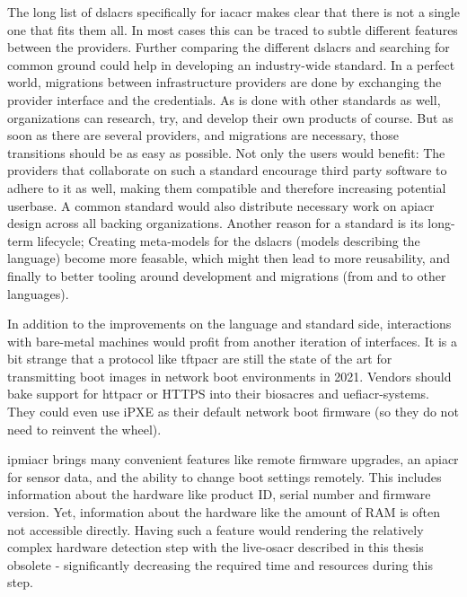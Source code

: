The long list of \gls{dslacr}s specifically for \gls{iacacr} makes clear that there is not a single one that fits them all. In most cases this can be traced to subtle different features between the providers. Further comparing the different \gls{dslacr}s and searching for common ground could help in developing an industry-wide standard. In a perfect world, migrations between infrastructure providers are done by exchanging the provider interface and the credentials. As is done with other standards as well, organizations can research, try, and develop their own products of course. But as soon as there are several providers, and migrations are necessary, those transitions should be as easy as possible. Not only the users would benefit: The providers that collaborate on such a standard encourage third party software to adhere to it as well, making them compatible and therefore increasing potential userbase. A common standard would also distribute necessary work on \gls{apiacr} design across all backing organizations. Another reason for a standard is its long-term lifecycle; Creating meta-models for the \gls{dslacr}s (models describing the language) become more feasable, which might then lead to more reusability, and finally to better tooling around development and migrations (from and to other languages).


In addition to the improvements on the language and standard side, interactions with bare-metal machines would profit from another iteration of interfaces. It is a bit strange that a protocol like \gls{tftpacr} are still the state of the art for transmitting boot images in network boot environments in 2021. Vendors should bake support for \gls{httpacr} or HTTPS into their \gls{biosacr}es and \gls{uefiacr}-systems. They could even use iPXE as their default network boot firmware (so they do not need to reinvent the wheel).

\Gls{ipmiacr} brings many convenient features like remote firmware upgrades, an \gls{apiacr} for sensor data, and the ability to change boot settings remotely. This includes information about the hardware like product ID, serial number and firmware version. Yet, information about the hardware like the amount of RAM is often not accessible directly. Having such a feature would rendering the relatively complex hardware detection step with the live-\gls{osacr} described in this thesis obsolete - significantly decreasing the required time and resources during this step.

